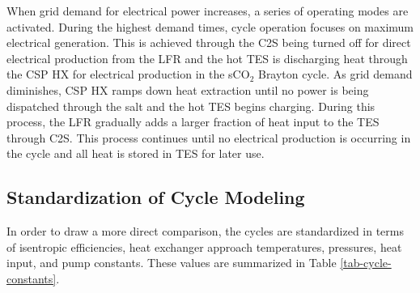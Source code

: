 \begin{paracol}{2}
When grid demand for electrical power increases, a series of operating modes are activated. During the highest demand times, cycle operation focuses on maximum electrical generation. This is achieved through the C2S being turned off for direct electrical production from the LFR and the hot TES is discharging heat through the CSP HX for electrical production in the sCO$_2$ Brayton cycle. As grid demand diminishes, CSP HX ramps down heat extraction until no power is being dispatched through the salt and the hot TES begins charging. During this process, the LFR gradually adds a larger fraction of heat input to the TES through C2S. This process continues until no electrical production is occurring in the cycle and all heat is stored in TES for later use.



\subsection{Standardization of Cycle Modeling}


In order to draw a more direct comparison, the cycles are standardized in terms of isentropic efficiencies, heat exchanger approach temperatures, pressures, heat input, and pump constants. These values are summarized in Table \ref{tab-cycle-constants}.


\end{paracol}
